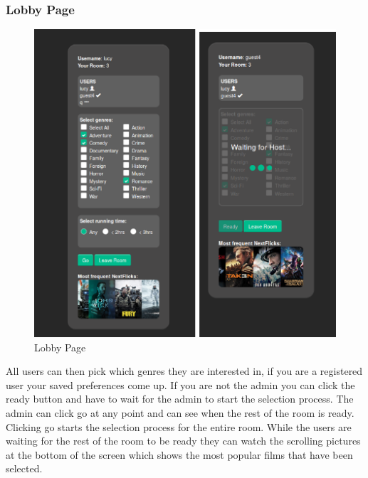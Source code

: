 \documentclass{article}
\begin{document}
\subsubsection{Lobby Page}
\begin{figure}[H]
\centering
\caption{Lobby Page}
\label{sec:sysarchitecture}
\includegraphics[scale=0.5]{lobbypage}
\end{figure}
All users can then pick which genres they are interested in, if you are a registered user your saved preferences come up. If you are not the admin you can click the ready button and have to wait for the admin to start the selection process. The admin can click go at any point and can see when the rest of the room is ready. Clicking go starts the selection process for the entire room. While the users are waiting for the rest of the room to be ready they can watch the scrolling pictures at the bottom of the screen which shows the most popular films that have been selected.
\end{document}
